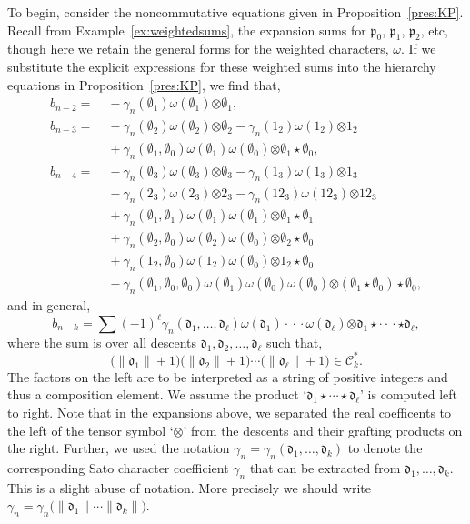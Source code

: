 \documentclass[5p,twocolumn]{elsarticle}
\newcommand*{\pf}{\mathfrak p}
\newcommand*{\df}{\mathfrak d}
\newcommand*{\botimes}{\boldsymbol{\otimes}}
\begin{document}
To begin, consider the noncommutative equations given in Proposition~\ref{pres:KP}.
Recall from Example~\ref{ex:weightedsums}, the expansion sums for $\pf_0$, $\pf_1$, $\pf_2$, etc, though here we retain the general forms for the weighted characters, $\omega$. 
If we substitute the explicit expressions for these weighted sums into the hierarchy equations in Proposition~\ref{pres:KP}, we find that,
\begin{align*}
  b_{n-2}=&\;-\gamma_n(\emptyset_1)\omega(\emptyset_1)\botimes\emptyset_1,\\
  b_{n-3}=&\;-\gamma_n(\emptyset_2)\omega(\emptyset_2)\botimes\emptyset_2-\gamma_n(1_2)\omega(1_2)\botimes1_2\\
         &\;+\gamma_n(\emptyset_1,\emptyset_0)\omega(\emptyset_1)\omega(\emptyset_0)\botimes\emptyset_1\star\emptyset_0,\\
  b_{n-4}=&\;-\gamma_n(\emptyset_3)\omega(\emptyset_3)\botimes\emptyset_3-\gamma_n(1_3)\omega(1_3)\botimes1_3\\
         &\;-\gamma_n(2_3)\omega(2_3)\botimes2_3-\gamma_n(12_3)\omega(12_3)\botimes12_3\\
         &\;+\gamma_n(\emptyset_1,\emptyset_1)\omega(\emptyset_1)\omega(\emptyset_1)\botimes\emptyset_1\star\emptyset_1\\
         &\;+\gamma_n(\emptyset_2,\emptyset_0)\omega(\emptyset_2)\omega(\emptyset_0)\botimes\emptyset_2\star\emptyset_0\\
         &\;+\gamma_n(1_2,\emptyset_0)\omega(1_2)\omega(\emptyset_0)\botimes1_2\star\emptyset_0\\
         &\;-\gamma_n(\emptyset_1,\emptyset_0,\emptyset_0)\omega(\emptyset_1)\omega(\emptyset_0)\omega(\emptyset_0)\!\botimes\!(\emptyset_1\star\emptyset_0)\star\emptyset_0,
\end{align*}
and in general,
\begin{equation*}
  b_{n-k}\!=\!\!\sum(-1)^\ell\gamma_n(\df_1,\ldots,\df_\ell)\omega(\df_1)\cdot\!\cdot\!\cdot\omega(\df_\ell)\botimes\df_1\star\cdot\!\cdot\!\cdot\star\df_\ell,
\end{equation*}
where the sum is over all descents $\df_1,\df_2,\ldots,\df_\ell$ such that,
\begin{equation}\label{eq:descentcomps}
\bigl(\|\df_1\|+1\bigr)\bigl(\|\df_2\|+1\bigr)\cdots\bigl(\|\df_\ell\|+1\bigr)\in\mathcal C_k^\ast.
\end{equation}
The factors on the left are to be interpreted as a string of positive integers and thus a composition element.
We assume the product `$\df_1\star\cdots\star\df_\ell$' is computed left to right.
Note that in the expansions above, we separated the real coefficents to the left of the tensor symbol `$\botimes$' from the descents and their grafting products on the right.
Further, we used the notation $\gamma_n=\gamma_n(\df_1,\ldots,\df_k)$ to denote the corresponding Sato character coefficient $\gamma_n$ that can be extracted from $\df_1,\ldots,\df_k$.
This is a slight abuse of notation. More precisely we should write $\gamma_n=\gamma_n\bigl(\|\df_1\|\cdots\|\df_k\|\bigr)$.
\end{document}
